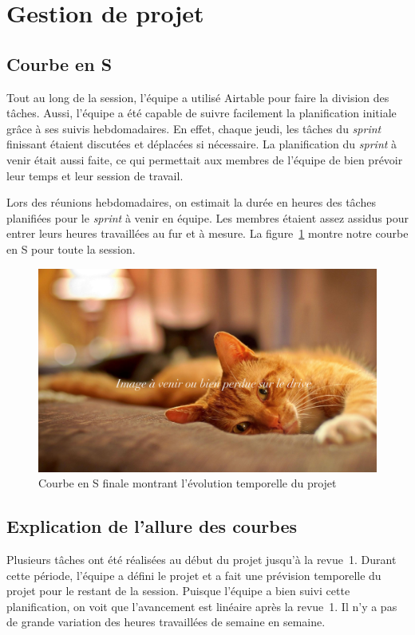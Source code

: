 \section{Gestion de projet}
	\subsection{Courbe en S}
	Tout au long de la session, l’équipe a utilisé Airtable pour faire la division des tâches. Aussi, l’équipe a été capable de suivre facilement la planification initiale grâce à ses suivis hebdomadaires. En effet, chaque jeudi, les tâches du \emph{sprint} finissant étaient discutées et déplacées si nécessaire. La planification du \emph{sprint} à venir était aussi faite, ce qui permettait aux membres de l’équipe de bien prévoir leur temps et leur session de travail. 

	Lors des réunions hebdomadaires, on estimait la durée en heures des tâches planifiées pour le \emph{sprint} à venir en équipe. Les membres étaient assez assidus pour entrer leurs heures travaillées au fur et à mesure. La figure~\ref{fig.courbeS} montre notre courbe en S pour toute la session.
	\begin{figure}[p]
		\includegraphics[width=\textwidth]{Pictures/Gestion/Chat}
		\caption{Courbe en S finale montrant l'évolution temporelle du projet}
		\label{fig.courbeS}
	\end{figure}

	\subsection{Explication de l'allure des courbes}
	Plusieurs tâches ont été réalisées au début du projet jusqu'à la revue~1. Durant cette période, l’équipe a défini le projet et a fait une prévision temporelle du projet pour le restant de la session. Puisque l’équipe a bien suivi cette planification, on voit que l’avancement est linéaire après la revue~1. Il n’y a pas de grande variation des heures travaillées de semaine en semaine.

